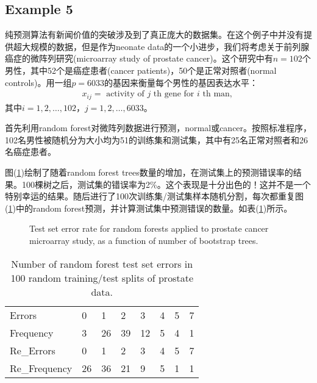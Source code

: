\documentclass[lang=cn,11pt,a4paper,cite=authoryear]{elegantpaper}
\begin{document}
\subsection{Example 5}

纯预测算法有新闻价值的突破涉及到了真正庞大的数据集。在这个例子中并没有提供超大规模的数据，但是作为neonate data的一个小进步，我们将考虑关于前列腺癌症的微阵列研究(microarray study of prostate cancer)。这个研究中有$n=102$个男性，其中52个是癌症患者(cancer patients)，50个是正常对照者(normal controls)。用一组$p=6033$的基因来衡量每个男性的基因表达水平：
\begin{align}
x_{i j}=\text { activity of } j \text { th gene for } i \text { th man, }
\end{align}
其中$i=1, 2, \ldots, 102$，$j = 1, 2, \ldots, 6033$。

首先利用random forest对微阵列数据进行预测，normal或cancer。按照标准程序，102名男性被随机分为大小均为51的训练集和测试集，其中有25名正常对照者和26名癌症患者。

图(\ref{fig5})绘制了随着random forest trees数量的增加，在测试集上的预测错误率的结果。100棵树之后，测试集的错误率为2\%。这个表现是十分出色的！这并不是一个特别幸运的结果。随后进行了100次训练集/测试集样本随机分割，每次都重复图(\ref{fig5})中的random forest预测，并计算测试集中预测错误的数量。如表(\ref{table2})所示。
\begin{figure}[H]
		\centering
		\caption{Test set error rate for random forests applied to prostate cancer microarray study, as a function of number of bootstrap trees.}
		\label{fig5}
\end{figure}

\begin{table}[H]
    \centering
    \caption{Number of random forest test set errors in \\100 random training/test splits of prostate data.}
    \label{table2}
    \begin{tabular}{llllllll}
    	\toprule
        Errors & 0 & 1 & 2 & 3 & 4 & 5 & 7 \\
        Frequency & 3 & 26 & 39 & 12 & 5 & 4 & 1 \\
        \midrule
        Re\_Errors & 0 & 1 & 2 & 3 & 4 & 5 & 7 \\
        Re\_Frequency & 26 & 36 & 21 & 9 & 5 & 1 & 1 \\
        \bottomrule
    \end{tabular}
\end{table}
\end{document}
